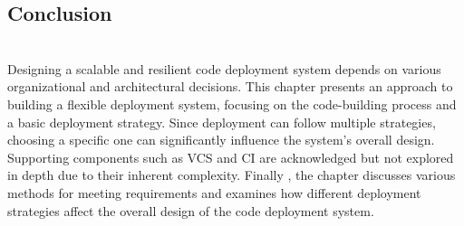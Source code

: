 \subsection{Conclusion}\label{DOd6KpBDbNVWEhs8gDFqK}
\\
Designing a scalable and resilient code deployment system depends on various organizational and architectural decisions. This chapter presents an approach to building a flexible deployment system, focusing on the code-building process and a basic deployment strategy. Since deployment can follow multiple strategies, choosing a specific one can significantly influence the system's overall design. Supporting components such as VCS and CI are acknowledged but not explored in depth due to their inherent complexity. Finally , the chapter discusses various methods for meeting requirements and examines how different deployment strategies affect the overall design of the code deployment system.

